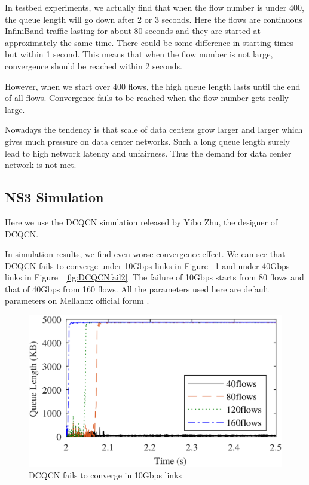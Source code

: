 \documentclass[12pt,a4paper]{article}
\begin{document}
In testbed experiments, we actually find that when the flow number is under 400, the queue length will go down after 2 or 3 seconds.
Here the flows are continuous InfiniBand traffic lasting for about 80 seconds and they are started at approximately the same time.
There could be some difference in starting times but within 1 second.
This means that when the flow number is not large, convergence should be reached within 2 seconds.

However, when we start over 400 flows, the high queue length lasts until the end of all flows.
Convergence fails to be reached when the flow number gets really large.

Nowadays the tendency is that scale of data centers grow larger and larger which gives much pressure on data center networks.
Such a long queue length surely lead to high network latency and unfairness.
Thus the demand for data center network is not met.

\subsection{NS3 Simulation}

Here we use the DCQCN simulation \cite{DCQCNsim} released by Yibo Zhu, the designer of DCQCN.

In simulation results, we find even worse convergence effect.
We can see that DCQCN fails to converge under 10Gbps links in Figure ~\ref{fig:DCQCNfail1}
and under 40Gbps links in Figure ~\ref{fig:DCQCNfail2}.
The failure of 10Gbps starts from 80 flows and that of 40Gbps from 160 flows.
All the parameters used here are default parameters on Mellanox official forum \cite{MellanoxOfficial}.

\begin{figure}[h!]
	\begin{center}
		\includegraphics[width=5in]{DCQCNfail1}
		\caption{DCQCN fails to converge in 10Gbps links}
		\label{fig:DCQCNfail1}
	\end{center}
\end{figure}
\end{document}
